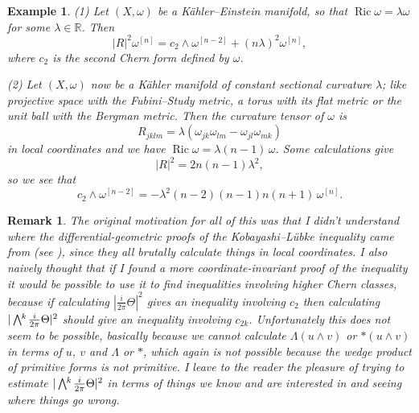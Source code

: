 \documentclass[11pt,a4paper]{amsart}
\def\^#1{^{[#1]}}
\def\bw#1{\bigwedge{}^{\mkern-5mu #1}\mkern2mu}
\DeclareMathOperator{\Ric}{Ric}
\def\RR{\mathbb{R}}
\def\curv{\frac{i}{2\pi} \Theta}
\theoremstyle{slthm}
\theoremstyle{sldef}
\newtheorem{exam}[theo]{Example}
\theoremstyle{slrem}
\newtheorem*{rema}{Remark}
\numberwithin{equation}{section}
\begin{document}
\begin{exam}
(1) Let $(X,\omega)$ be a K\"ahler--Einstein manifold, so that $\Ric \omega
= \lambda \omega$ for some $\lambda \in \RR$. Then%
$$
\lvert R \rvert^2 \omega\^n
= c_2 \wedge \omega\^{n-2} + (n \lambda)^2 \omega\^n,
$$
where $c_2$ is the second Chern form defined by $\omega$.

\smallskip
(2) Let $(X,\omega)$ now be a K\"ahler manifold of constant sectional
curvature $\lambda$; like projective space with the Fubini--Study
metric, a torus with its flat metric or the unit ball with the Bergman
metric. Then the curvature tensor of $\omega$ is
$$
R_{jklm} = \lambda(\omega_{jk}\omega_{lm} - \omega_{jl}\omega_{mk})
$$
in local coordinates and we have $\Ric \omega =
\lambda(n-1)\,\omega$. Some calculations give
$$
|R|^2 
= 2n(n-1) \lambda^2,
$$
so we see that
$$
c_2 \wedge \omega\^{n-2}
= -\lambda^2(n-2)(n-1)n(n+1)\,\omega\^n.
$$
\end{exam}


\begin{rema}
The original motivation for all of this was that I didn't understand
where the differential-geometric proofs of the Kobayashi--L\"{u}bke
inequality came from (see \cite{Chen-Ogiue,Lubke,Siu}), since they all
brutally calculate things in local coordinates. I also naively thought that
if I found a more coordinate-invariant proof of the inequality it would be
possible to use it to find inequalities involving higher Chern classes,
because if calculating $|\curv|^2$ gives an inequality involving $c_2$ then
calculating $|\bw{k}\curv|^2$ should give an inequality involving
$c_{2k}$. Unfortunately this does not seem to be possible, basically
because we cannot calculate $\Lambda(u \wedge v)$ or $*(u \wedge v)$
in terms of $u$, $v$ and $\Lambda$ or $*$, which again is not possible
because the wedge product of primitive forms is not primitive. I leave to
the reader the pleasure of trying to estimate $|\bw{k}\curv|^2$ in terms of
things we know and are interested in and seeing where things go wrong.
\end{rema}





\end{document}
